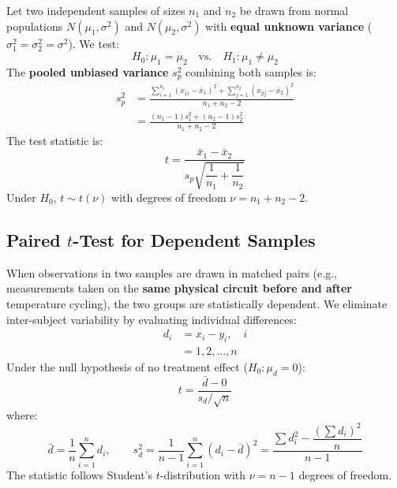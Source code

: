 \documentclass[12pt,a4paper]{article}
\begin{document}
\begin{tcolorbox}[formulabox, title={\textbf{Test 2: Two-Sample Independent $t$-Test with Pooled Variance}}]
Let two independent samples of sizes $n_1$ and $n_2$ be drawn from normal populations $N(\mu_1, \sigma^2)$ and $N(\mu_2, \sigma^2)$ with \textbf{equal unknown variance} ($\sigma_1^2 = \sigma_2^2 = \sigma^2$). We test:
\begin{equation}
  H_0: \mu_1 = \mu_2 \quad \text{vs.} \quad H_1: \mu_1 \ne \mu_2
\end{equation}
The \textbf{pooled unbiased variance} $s_p^2$ combining both samples is:
\begin{equation}
  \begin{aligned}
    s_p^2 &= \frac{\sum_{i=1}^{n_1} (x_{1i} - \bar{x}_1)^2 + \sum_{j=1}^{n_2} (x_{2j} - \bar{x}_2)^2}{n_1 + n_2 - 2} \\[3pt]
    &= \frac{(n_1 - 1)s_1^2 + (n_2 - 1)s_2^2}{n_1 + n_2 - 2}
  \end{aligned}
\end{equation}
The test statistic is:
\begin{equation}
  t = \frac{\bar{x}_1 - \bar{x}_2}{s_p \sqrt{\dfrac{1}{n_1} + \dfrac{1}{n_2}}}
\end{equation}
Under $H_0$, $t \sim t(\nu)$ with degrees of freedom $\nu = n_1 + n_2 - 2$.
\end{tcolorbox}

\subsection{Paired \texorpdfstring{$t$}{t}-Test for Dependent Samples}

\begin{tcolorbox}[defbox, title={\textbf{Test 3: Paired $t$-Test Principle}}]
When observations in two samples are drawn in matched pairs (e.g., measurements taken on the \textbf{same physical circuit before and after} temperature cycling), the two groups are statistically dependent. We eliminate inter-subject variability by evaluating individual differences:
\begin{equation}
  \begin{aligned}
    d_i &= x_i - y_i, \quad i \\[3pt]
    &= 1, 2, \ldots, n
  \end{aligned}
\end{equation}
Under the null hypothesis of no treatment effect ($H_0: \mu_d = 0$):
\begin{equation}
  t = \frac{\bar{d} - 0}{s_d / \sqrt{n}}
\end{equation}
where:
\begin{equation}
  \bar{d} = \frac{1}{n}\sum_{i=1}^n d_i, \qquad s_d^2 = \frac{1}{n - 1}\sum_{i=1}^n (d_i - \bar{d})^2 = \frac{\sum d_i^2 - \dfrac{(\sum d_i)^2}{n}}{n - 1}
\end{equation}
The statistic follows Student's $t$-distribution with $\nu = n - 1$ degrees of freedom.
\end{tcolorbox}
\end{document}
